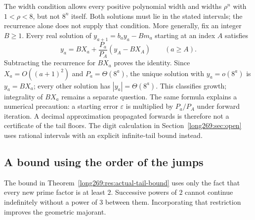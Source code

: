 \documentclass[11pt]{article}
\theoremstyle{remark}
\theoremstyle{plain}
\begin{document}
The width condition allows every positive polynomial width and widths
$\rho^n$ with $1<\rho<8$, but not $8^n$ itself.  Both solutions must lie in
the stated intervals; the recurrence alone does not supply that condition.
More generally, fix an integer $B\ge1$.  Every real solution of
$y_{a+1}=b_ay_a-Bm_a$ starting at an index $A$ satisfies
\[
 y_a=BX_a+\frac{P_a}{P_A}(y_A-BX_A)\qquad(a\ge A).
\]
Subtracting the recurrence for $BX_a$ proves the identity.  Since
$X_a=O((a+1)^2)$ and $P_a=\Theta(8^a)$, the unique solution with
$y_a=o(8^a)$ is $y_a=BX_a$; every other solution has
$|y_a|=\Theta(8^a)$.  This classifies growth; integrality of $BX_a$
remains a separate question.
The same formula explains a numerical precaution: a starting error
$\varepsilon$ is multiplied by $P_a/P_A$ under forward iteration.
A decimal approximation propagated forwards is therefore not a
certificate of the tail floors.  The digit calculation in
Section~\ref{long269:sec:open} uses rational intervals with an explicit
infinite-tail bound instead.

\subsection{A bound using the order of the jumps}\label{long269:sec:smaller-bound}
The bound in Theorem~\ref{long269:res:actual-tail-bound} uses only the fact
that every new prime factor is at least $2$. Successive powers of $2$
cannot continue indefinitely without a power of $3$ between them.
Incorporating that restriction improves the geometric majorant.
\end{document}
